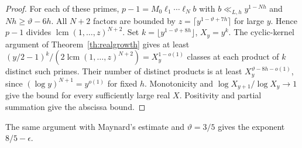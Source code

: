 \begin{proof}
For each of these primes, $p-1=M_0\ell_1\cdots\ell_N b$ with $b\ll_{L,h}y^{1-Nh}$ and $Nh\ge\vartheta-6h$. All $N+2$ factors are bounded by $z=\lceil y^{1-\vartheta+7h}\rceil$ for large $y$. Hence $p-1$ divides $\operatorname{lcm}(1,\ldots,z)^{N+2}$. Set $k=\lfloor y^{1-\vartheta+8h}\rfloor$, $X_y=y^k$. The cyclic-kernel argument of Theorem~\ref{th:realgrowth} gives at least $(y/2-1)^k/(2\operatorname{lcm}(1,\ldots,z)^{N+2})=X_y^{1-o(1)}$ classes at each product of $k$ distinct such primes. Their number of distinct products is at least $X_y^{\vartheta-8h-o(1)}$, since $(\log y)^{N+1}=y^{o(1)}$ for fixed $h$. Monotonicity and $\log X_{y+1}/\log X_y\to1$ give the bound for every sufficiently large real $X$. Positivity and partial summation give the abscissa bound.
\end{proof}

\begin{remark}
The same argument with Maynard's estimate
\cite[Thm.~1.1]{Maynard} and $\vartheta=3/5$ gives the exponent
$8/5-\epsilon$.
\end{remark}